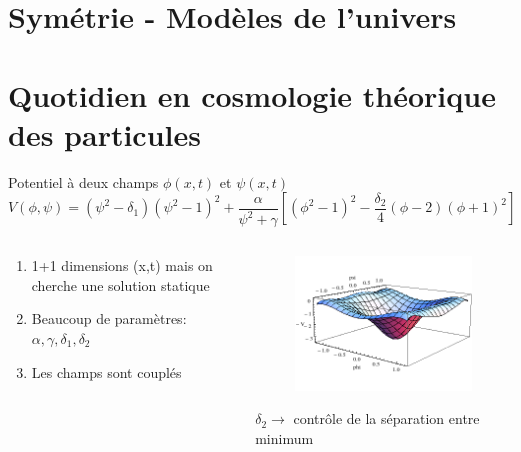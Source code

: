 \documentclass[handout]{beamer}
\begin{document}
\section{Symétrie - Modèles de l'univers }
\begin{frame}

\end{frame}






\section{Quotidien en cosmologie théorique des particules}
\begin{frame}
\begin{block}{Potentiel à deux champs $\phi(x,t)$ et $\psi(x,t)$}
\begin{equation*}
V(\phi,\psi)=(\psi^2-\delta_1)(\psi^2-1)^2+\frac{\alpha}{\psi^2+\gamma}[(\phi^2-1)^2 - \frac{\delta_2}{4}(\phi-2)(\phi+1)^2] 
\end{equation*}
\begin{columns}
    \begin{column}{.5\linewidth}
  
\begin{enumerate}
\item 1+1 dimensions (x,t) mais on cherche une solution statique
\item Beaucoup de paramètres: $\alpha, \gamma, \delta_1, \delta_2$
\item Les champs sont couplés
\end{enumerate}  
    \end{column}
    \begin{column}{.5\linewidth}
    \begin{figure}[0.3\textwidth]
    \includegraphics[scale=0.3]{pot.png}
    \end{figure}
   $\delta_2 \rightarrow$ contrôle de la séparation entre minimum \\
    \end{column}
  \end{columns}
\end{block}
\end{frame}
\end{document}
